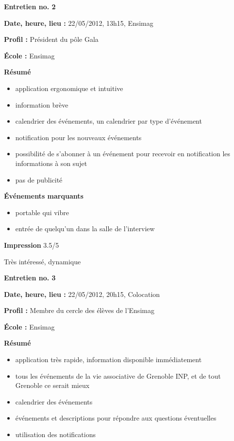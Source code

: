 \documentclass[a4paper, 11px]{article}
\begin{document}
 \textbf {\large Entretien no. 2}

\textbf{Date, heure, lieu : }
22/05/2012, 13h15, Ensimag

\textbf{Profil : }
Président du pôle Gala

\textbf{École : }
Ensimag

\textbf{Résumé}
	\begin{itemize}
		\item application ergonomique et intuitive
		\item information brève
		\item calendrier des événements, un calendrier par type d'événement
		\item notification pour les nouveaux événements
		\item possibilité de s'abonner à un événement pour recevoir en notification les informations à son sujet
		\item pas de publicité
	\end{itemize}

\vspace{.25cm}
\textbf{Événements marquants}
	\begin{itemize}
		\item portable qui vibre
		\item entrée de quelqu'un dans la salle de l'interview
	\end{itemize}

\vspace{.25cm}
\textbf{Impression} 3.5/5 

Très intéressé, dynamique



\vspace{.3cm}

 \textbf {\large Entretien no. 3}

\textbf{Date, heure, lieu : }
22/05/2012, 20h15, Colocation

\textbf{Profil : }
Membre du cercle des élèves de l'Ensimag

\textbf{École : }
Ensimag

\textbf{Résumé}
	\begin{itemize}
		\item application très rapide, information disponible immédiatement
		\item tous les événements de la vie associative de Grenoble INP, et de tout Grenoble ce serait mieux
		\item calendrier des événements
		\item événements et descriptions pour répondre aux questions éventuelles
		\item utilisation des notifications
	\end{itemize}
\end{document}
